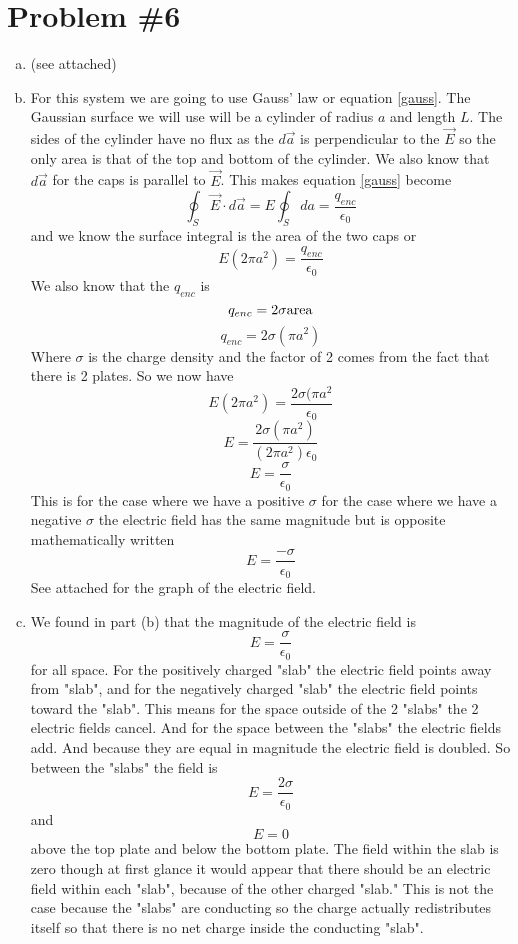 \documentclass[11pt]{article}
\numberwithin{equation}{section}
\begin{document}
\section{Problem \#6}
\begin{enumerate}[(a)]
\item 
(see attached)
\item
For this system we are going to use Gauss' law or equation \ref{gauss}. The Gaussian surface we will use will be a cylinder of radius $a$ and length $L$. The sides of the cylinder have no flux as the $d\vec{a}$ is perpendicular to the $\vec{E}$ so the only area is that of the top and bottom of the cylinder. We also know that $d\vec{a}$ for the caps is parallel to $\vec{E}$. This makes equation \ref{gauss} become
$$\oint_S \vec{E} \cdot d\vec{a} = E\oint_S da = \frac{q_{enc}}{\epsilon_0}$$
and we know the surface integral is the area of the two caps or
$$E(2\pi a^2)= \frac{q_{enc}}{\epsilon_0}$$
We also know that the $q_{enc}$ is 
$$q_{enc} = 2\sigma \textnormal{area}$$
$$q_{enc} = 2\sigma (\pi a^2)$$
Where $\sigma$ is the charge density and the factor of 2 comes from the fact that there is 2 plates. So we now have
$$E(2\pi a^2)= \frac{2\sigma (\pi a^2}{\epsilon_0}$$
$$E= \frac{2\sigma (\pi a^2)}{(2\pi a^2)\epsilon_0}$$
$$E= \frac{\sigma}{\epsilon_0}$$
This is for the case where we have a positive $\sigma$ for the case where we have a negative $\sigma$ the electric field has the same magnitude but is opposite mathematically written
$$E= \frac{-\sigma}{\epsilon_0}$$
See attached for the graph of the electric field.

\item 
We found in part (b) that the magnitude of the electric field is $$E = \frac{\sigma}{\epsilon_0}$$ for all space. For the positively charged "slab" the electric field points away from "slab", and for the negatively charged "slab" the electric field points toward the "slab". This means for the space outside of the 2 "slabs" the 2 electric fields cancel. And for the space between the "slabs" the electric fields add. And because they are equal in magnitude the electric field is doubled. So between the "slabs" the field is
$$E = \frac{2\sigma}{\epsilon_0}$$
and $$E= 0$$ above the top plate and below the bottom plate.
The field within the slab is zero though at first glance it would appear that there should be an electric field within each "slab", because of the other charged "slab." This is not the case because the "slabs" are conducting so the charge actually redistributes itself so that there is no net charge inside the conducting "slab".
\end{enumerate}
\end{document}
